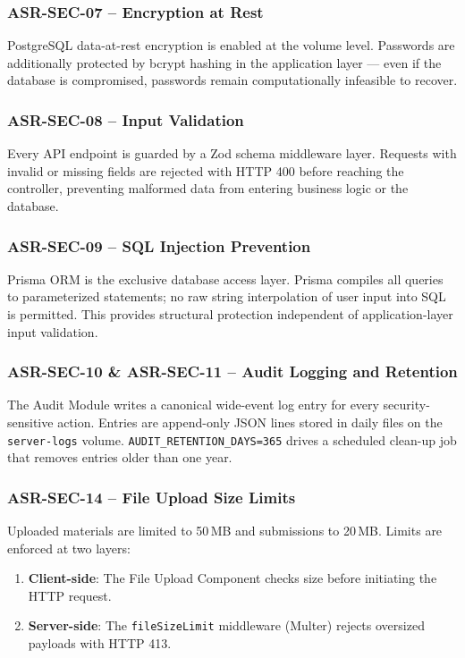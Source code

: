 \documentclass[12pt,a4paper]{article}
\begin{document}
\subsubsection{ASR-SEC-07 -- Encryption at Rest}

PostgreSQL data-at-rest encryption is enabled at the volume level. Passwords are additionally protected by bcrypt hashing in the application layer --- even if the database is compromised, passwords remain computationally infeasible to recover.

\subsubsection{ASR-SEC-08 -- Input Validation}

Every API endpoint is guarded by a Zod schema middleware layer. Requests with invalid or missing fields are rejected with HTTP 400 before reaching the controller, preventing malformed data from entering business logic or the database.

\subsubsection{ASR-SEC-09 -- SQL Injection Prevention}

Prisma ORM is the exclusive database access layer. Prisma compiles all queries to parameterized statements; no raw string interpolation of user input into SQL is permitted. This provides structural protection independent of application-layer input validation.

\subsubsection{ASR-SEC-10 \& ASR-SEC-11 -- Audit Logging and Retention}

The Audit Module writes a canonical wide-event log entry for every security-sensitive action. Entries are append-only JSON lines stored in daily files on the \texttt{server-logs} volume. \texttt{AUDIT\_RETENTION\_DAYS=365} drives a scheduled clean-up job that removes entries older than one year.

\subsubsection{ASR-SEC-14 -- File Upload Size Limits}

Uploaded materials are limited to 50\,MB and submissions to 20\,MB. Limits are enforced at two layers:
\begin{enumerate}[noitemsep]
  \item \textbf{Client-side}: The File Upload Component checks size before initiating the HTTP request.
  \item \textbf{Server-side}: The \texttt{fileSizeLimit} middleware (Multer) rejects oversized payloads with HTTP 413.
\end{enumerate}
\end{document}
